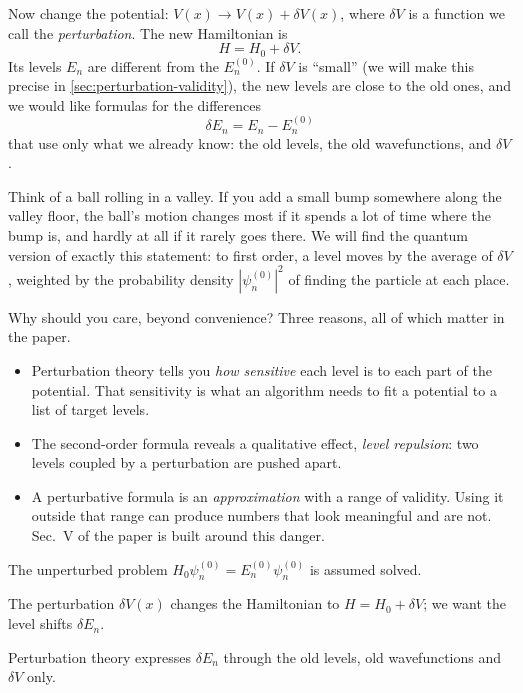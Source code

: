 Now change the potential: $V(x)\to V(x)+\delta V(x)$, where $\delta V$ is a function we call the \emph{perturbation}. The new Hamiltonian is
\begin{equation}
H=H_0+\delta V .
\label{eq:perturbation-H}
\end{equation}
Its levels $E_n$ are different from the $E_n^{(0)}$. If $\delta V$ is ``small'' (we will make this precise in \cref{sec:perturbation-validity}), the new levels are close to the old ones, and we would like formulas for the differences
\[
\delta E_n = E_n - E_n^{(0)}
\]
that use only what we already know: the old levels, the old wavefunctions, and $\delta V$.

Think of a ball rolling in a valley. If you add a small bump somewhere along the valley floor, the ball's motion changes most if it spends a lot of time where the bump is, and hardly at all if it rarely goes there. We will find the quantum version of exactly this statement: to first order, a level moves by the average of $\delta V$, weighted by the probability density $|\psi_n^{(0)}|^2$ of finding the particle at each place.

Why should you care, beyond convenience? Three reasons, all of which matter in the paper.
\begin{itemize}
\item Perturbation theory tells you \emph{how sensitive} each level is to each part of the potential. That sensitivity is what an algorithm needs to fit a potential to a list of target levels.
\item The second-order formula reveals a qualitative effect, \emph{level repulsion}: two levels coupled by a perturbation are pushed apart.
\item A perturbative formula is an \emph{approximation} with a range of validity. Using it outside that range can produce numbers that look meaningful and are not. Sec.~V of the paper is built around this danger.
\end{itemize}

\begin{keyideas}
\item The unperturbed problem $H_0\psi_n^{(0)}=E_n^{(0)}\psi_n^{(0)}$ is assumed solved.
\item The perturbation $\delta V(x)$ changes the Hamiltonian to $H=H_0+\delta V$; we want the level shifts $\delta E_n$.
\item Perturbation theory expresses $\delta E_n$ through the old levels, old wavefunctions and $\delta V$ only.
\end{keyideas}

